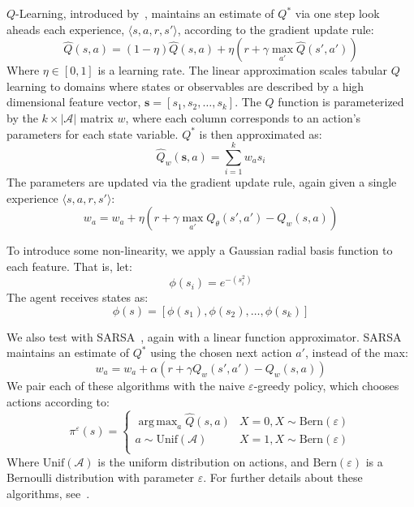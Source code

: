 \documentclass{article}
\newcommand{\mc}{\mathcal}
\DeclareMathOperator*{\argmax}{arg\,max}
\begin{document}
{$Q$-Learning, introduced by~\citet{watkins1992q}, maintains an estimate of $Q^*$ via one step look aheads each experience, $\langle s, a, r, s' \rangle$, according to the gradient update rule:
\begin{equation}
\hat{Q}(s,a) = (1-\eta) \hat{Q}(s,a) + \eta(r + \gamma \max_{a'} \hat{Q}(s', a'))
\end{equation}
Where $\eta \in [0,1]$ is a learning rate. The linear approximation scales tabular $Q$ learning to domains where states or observables are described by a high dimensional feature vector, $\bm{s} = [s_1, s_2, \ldots, s_k]$. The $Q$ function is parameterized by the $k \times |\mc{A}|$ matrix $w$, where each column corresponds to an action's parameters for each state variable. $Q^*$ is then approximated as:
\begin{equation}
\hat{Q}_w(\bm{s},a) = \sum_{i=1}^k w_a s_i
\end{equation}
The parameters are updated via the gradient update rule, again given a single experience $\langle s, a, r, s' \rangle$:
\begin{equation}
w_a = w_a + \eta \left( r + \gamma \max_{a'} Q_\theta(s',a') - Q_w(s,a)\right)
\end{equation}

To introduce some non-linearity, we apply a Gaussian radial basis function to each feature. That is, let:
\begin{equation}
\phi(s_i) = e^{-(s_i^2)}
\end{equation}
The agent receives states as:
\begin{equation}
\phi(s) = [\phi(s_1), \phi(s_2), \ldots, \phi(s_k)]
\end{equation}

We also test with SARSA~\cite{rummery1994line}, again with a linear function approximator. SARSA maintains an estimate of $Q^*$ using the chosen next action $a'$, instead of the max:
\begin{equation}
w_a = w_a + \alpha \left( r + \gamma Q_w(s',a') - Q_w(s,a)\right)
\end{equation}
We pair each of these algorithms with the naive $\varepsilon$-greedy policy, which chooses actions according to:
\begin{equation}
\pi^\varepsilon(s) = \begin{cases}
\argmax_a \hat{Q}(s,a)& X = 0, X \sim \text{Bern}(\varepsilon) \\
a \sim \text{Unif}(\mc{A})& X = 1, X \sim \text{Bern}(\varepsilon) \\
\end{cases}
\end{equation}
Where $\text{Unif}(\mc{A})$ is the uniform distribution on actions, and $\text{Bern}(\varepsilon)$ is a Bernoulli distribution with parameter $\varepsilon$. For further details about these algorithms, see~\citet{geramifard2013tutorial}.

}
\end{document}
